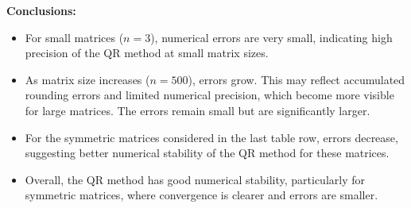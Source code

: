 \textbf{Conclusions:}
\begin{itemize}
    \item For small matrices (\( n = 3 \)), numerical errors are very small, indicating high precision of the QR method at small matrix sizes.
    \item As matrix size increases (\( n = 500 \)), errors grow. This may reflect accumulated rounding errors and limited numerical precision, which become more visible for large matrices. The errors remain small but are significantly larger.
    \item For the symmetric matrices considered in the last table row, errors decrease, suggesting better numerical stability of the QR method for these matrices.
    \item Overall, the QR method has good numerical stability, particularly for symmetric matrices, where convergence is clearer and errors are smaller.
\end{itemize}
